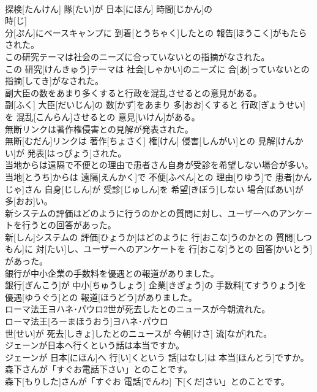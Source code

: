 \documentclass[8pt]{extreport}
\begin{document}
\begin{CJK}{UTF8}{min}
\\	探検[たんけん] 隊[たい]が 日本[にほん] 時間[じかん]の 
\\	時[じ] 
\\	分[ぷん]にベースキャンプに 到着[とうちゃく]したとの 報告[ほうこく]がもたらされた。
\\	この研究テーマは社会のニーズに合っていないとの指摘がなされた。	
\\	この 研究[けんきゅう]テーマは 社会[しゃかい]のニーズに 合[あ]っていないとの 指摘[してき]がなされた。
\\	副大臣の数をあまり多くすると行政を混乱させるとの意見がある。	
\\	副[ふく] 大臣[だいじん]の 数[かず]をあまり 多[おお]くすると 行政[ぎょうせい]を 混乱[こんらん]させるとの 意見[いけん]がある。
\\	無断リンクは著作権侵害との見解が発表された。	
\\	無断[むだん]リンクは 著作[ちょさく] 権[けん] 侵害[しんがい]との 見解[けんかい]が 発表[はっぴょう]された。
\\	当地からは遠隔で不便との理由で患者さん自身が受診を希望しない場合が多い。	
\\	当地[とうち]からは 遠隔[えんかく]で 不便[ふべん]との 理由[りゆう]で 患者[かんじゃ]さん 自身[じしん]が 受診[じゅしん]を 希望[きぼう]しない 場合[ばあい]が 多[おお]い。
\\	新システムの評価はどのように行うのかとの質問に対し、ユーザーへのアンケートを行うとの回答があった。	
\\	新[しん]システムの 評価[ひょうか]はどのように 行[おこな]うのかとの 質問[しつもん]に 対[たい]し、ユーザーへのアンケートを 行[おこな]うとの 回答[かいとう]があった。
\\	銀行が中小企業の手数料を優遇との報道がありました。	
\\	銀行[ぎんこう]が 中小[ちゅうしょう] 企業[きぎょう]の 手数料[てすうりょう]を 優遇[ゆうぐう]との 報道[ほうどう]がありました。
\\	ローマ法王ヨハネ･パウロ2世が死去したとのニュースが今朝流れた。	
\\	ローマ法王[ろーまほうおう]ヨハネ･パウロ 
\\	世[せい]が 死去[しきょ]したとのニュースが 今朝[けさ] 流[なが]れた。
\\	ジェーンが日本へ行くという話は本当ですか。	
\\	ジェーンが 日本[にほん]へ 行[い]くという 話[はなし]は 本当[ほんとう]ですか。
\\	森下さんが「すぐお電話下さい」とのことです。	
\\	森下[もりした]さんが「すぐお 電話[でんわ] 下[くだ]さい」とのことです。

\end{CJK}
\end{document}

